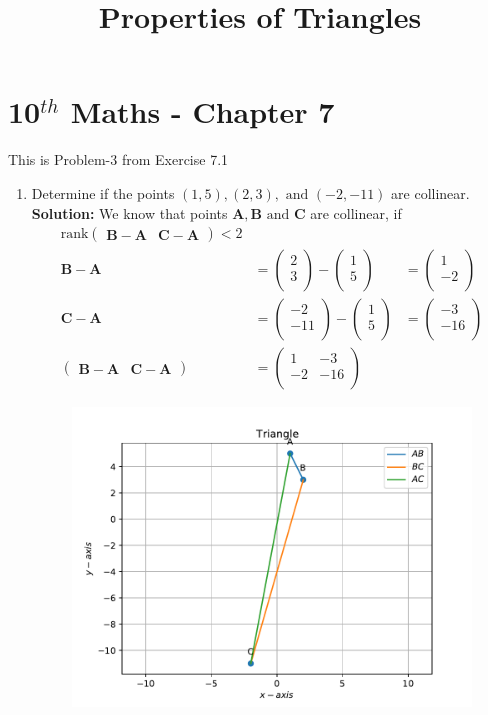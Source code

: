 \documentclass[12pt]{article}
\newcommand{\solution}{\noindent \textbf{Solution: }}
\newcommand{\myvec}[1]{\ensuremath{\begin{pmatrix}#1\end{pmatrix}}}
\let\vec\mathbf
\begin{document}
\begin{center}
\title{\textbf{Properties of Triangles}}
\date{\vspace{-5ex}} %
\maketitle
\end{center}
\setcounter{page}{1}

\section{10$^{th}$ Maths - Chapter 7}
This is Problem-3 from Exercise 7.1
\begin{enumerate}
\item Determine if the points $(1,5), (2,3), \text{ and } (-2,-11)$ are collinear.  \\
\solution 
 We know that points $\vec{A}, \vec{B} \text{ and } \vec{C}$ are collinear, if
\begin{align}
  \label{eq:1}
	\text{rank}\myvec{ \vec{B}-\vec{A} & \vec{C}-\vec{A}} <  2 \\
	 \vec{B}-\vec{A} &=  \myvec{
  2 \\
  3 \\
 } - \myvec{
  1 \\
  5 \\
 } &= \myvec{
 1 \\
 -2 \\
 }
 \\
\vec{C}-\vec{A} &=  \myvec{
  -2 \\
  -11 \\
 } - \myvec{
  1 \\
  5 \\
 } &= \myvec{
 -3 \\
 -16 \\
 }  \\
\label{eq:4}
\myvec{ \vec{B}-\vec{A} & \vec{C}-\vec{A}} &= \myvec{ 
       1 & -3 \\
       -2 & -16 \\
} 
\end{align}
\begin{figure}[!h]
	\begin{center}
		\includegraphics[width=\columnwidth]{./figs/problem3.pdf}

\end{center}
\end{figure}
\end{enumerate}
\end{document}
